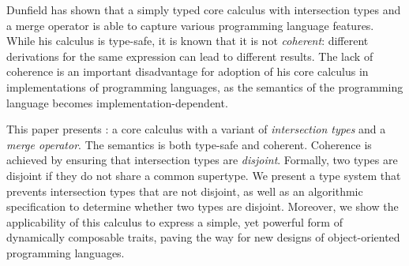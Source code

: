 Dunfield has shown that a simply typed core calculus with intersection types and
a merge operator is able to capture various programming language features. While
his calculus is type-safe, it is known that it is not \emph{coherent}:
different derivations for the same expression can lead to different results. The
lack of coherence is an important disadvantage for adoption of his core calculus
in implementations of programming languages, as the semantics of the programming
language becomes implementation-dependent.

This paper presents \name: a core calculus with a variant of \emph{intersection
types} and a \emph{merge operator}. The semantics \name is both type-safe and
coherent. Coherence is achieved by ensuring that intersection types are
\emph{disjoint}. Formally, two types are disjoint if they do not share a common
supertype. We present a type system that prevents intersection types that are
not disjoint, as well as an algorithmic specification to determine whether two
types are disjoint. Moreover, we show the applicability of this calculus to
express a simple, yet powerful form of dynamically composable traits, paving the way for new
designs of object-oriented programming languages.
